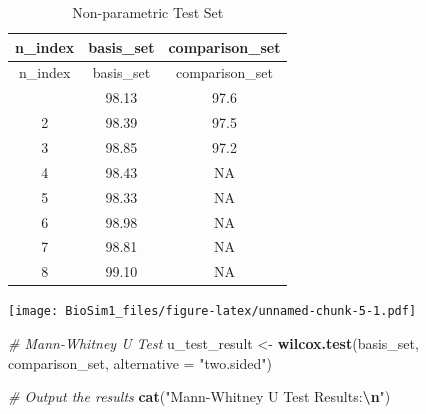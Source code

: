 \documentclass[
  12pt,
  a4paper,
]{article}
\newenvironment{Shaded}{\begin{snugshade}}{\end{snugshade}}
\newcommand{\AttributeTok}[1]{\textcolor[rgb]{0.13,0.29,0.53}{#1}}
\newcommand{\CommentTok}[1]{\textcolor[rgb]{0.56,0.35,0.01}{\textit{#1}}}
\newcommand{\DecValTok}[1]{\textcolor[rgb]{0.00,0.00,0.81}{#1}}
\newcommand{\FunctionTok}[1]{\textcolor[rgb]{0.13,0.29,0.53}{\textbf{#1}}}
\newcommand{\NormalTok}[1]{#1}
\newcommand{\OtherTok}[1]{\textcolor[rgb]{0.56,0.35,0.01}{#1}}
\newcommand{\SpecialCharTok}[1]{\textcolor[rgb]{0.81,0.36,0.00}{\textbf{#1}}}
\newcommand{\StringTok}[1]{\textcolor[rgb]{0.31,0.60,0.02}{#1}}
\numberwithin{equation}{section}
\theoremstyle{plain}
\theoremstyle{definition}
\theoremstyle{remark}
\theoremstyle{note}
\begin{document}
\begin{longtable}[]{@{}ccc@{}}
\caption{Non-parametric Test Set}\tabularnewline
\toprule\noalign{}
n\_index & basis\_set & comparison\_set \\
\midrule\noalign{}
\endfirsthead
\toprule\noalign{}
n\_index & basis\_set & comparison\_set \\
\midrule\noalign{}
\endhead
\bottomrule\noalign{}
\endlastfoot
1 & 98.13 & 97.6 \\
2 & 98.39 & 97.5 \\
3 & 98.85 & 97.2 \\
4 & 98.43 & NA \\
5 & 98.33 & NA \\
6 & 98.98 & NA \\
7 & 98.81 & NA \\
8 & 99.10 & NA \\
\end{longtable}

\begin{Shaded}
\end{Shaded}

\texttt{[image: BioSim1\_files/figure-latex/unnamed-chunk-5-1.pdf]}

\newpage

\begin{Shaded}
\begin{Highlighting}[]
\CommentTok{\# Mann{-}Whitney U Test}
\NormalTok{u\_test\_result }\OtherTok{\textless{}{-}} \FunctionTok{wilcox.test}\NormalTok{(basis\_set, comparison\_set, }\AttributeTok{alternative =} \StringTok{"two.sided"}\NormalTok{)}

\CommentTok{\# Output the results}
\FunctionTok{cat}\NormalTok{(}\StringTok{"Mann{-}Whitney U Test Results:}\SpecialCharTok{\textbackslash{}n}\StringTok{"}\NormalTok{)}
\end{Highlighting}
\end{Shaded}
\end{document}
